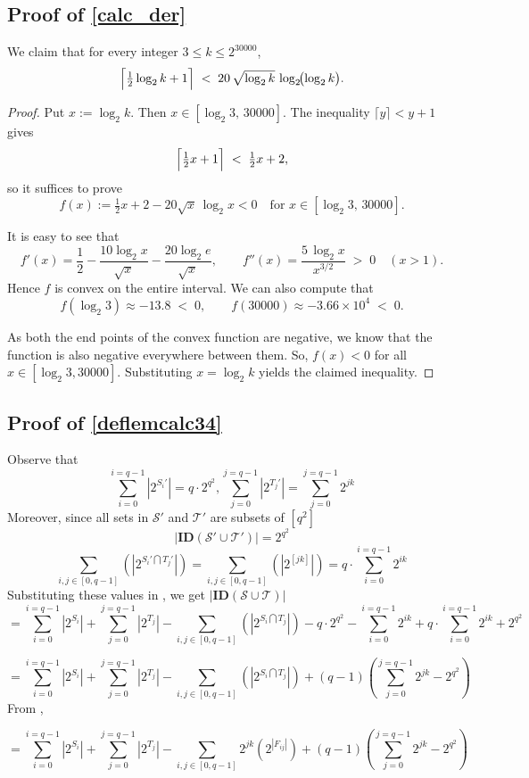 \documentclass[11pt,a4paper]{article}
\theoremstyle{definition}
\begin{document}
\subsection{Proof of \texorpdfstring{\cref{calc_der}}{Observation 24}}\label{proof_of_calc_der}

We claim that for every integer $3 \le k \le 2^{30000}$,
\[
\Bigl\lceil \tfrac12\log_2 k + 1 \Bigr\rceil
\;<\;
20\,\sqrt{\log_2 k}\,
      \log_2\!\bigl(\log_2 k\bigr).
\]


\begin{proof}
Put $x:=\log_2 k$.  Then $x\in[\log_2 3,\,30000]$.  The inequality
\(\lceil y\rceil<y+1\) gives
\[
\Bigl\lceil \tfrac12 x + 1 \Bigr\rceil
\;<\;
\tfrac12 x + 2,
\]
so it suffices to prove
\[
f(x):=\tfrac12 x + 2 - 20\sqrt{x}\,\log_2 x<0
\quad\text{for }x\in[\log_2 3,\,30000].
\]

\medskip
It is easy to see that
\[
f'(x)=\frac12-\frac{10\log_2 x}{\sqrt{x}}
      -\frac{20\log_2 e}{\sqrt{x}}, 
\qquad
f''(x)
      =\frac{5\,\log_2 x}{x^{3/2}}
      \;>\;0
      \quad(x>1).
\]
Hence \(f\) is convex on the entire interval. We can also compute that
\[
f(\log_2 3)\approx -13.8\;<\;0,
\qquad
f(30000)\approx -3.66\times 10^{4}\;<\;0.
\]


As both the end points of the convex function are negative, we know that the function is also negative everywhere between them. So, \(f(x)<0\) for all
\(x\in[\log_2 3,30000]\).
Substituting \(x=\log_2 k\) yields the claimed inequality.
\end{proof}

\subsection{Proof of \texorpdfstring{\cref{deflemcalc34}}{Lemma 34}}\label{obsalgman}
Observe that $$ \sum_{i=0}^{i=q-1} |2^{S_i'}| = q\cdot 2^{q^2}, \sum_{j=0}^{j=q-1} |2^{T_j'}| = \sum_{j=0}^{j=q-1} 2^{jk}$$
Moreover, since all sets in $\mathcal{S}'$ and $\mathcal{T}'$ are subsets of $[q^2]$
$$|\mathbf{ID}(\mathcal{S}'\cup \mathcal{T}')|=2^{q^2}$$
$$ \sum_{i,j \in [0,q-1]} (|2^{S_i'\bigcap T_j'}|) = \sum_{i,j \in [0,q-1]} (|2^{[jk]}|) =q\cdot \sum_{i=0}^{i=q-1} 2^{ik} $$
Substituting these values in , we get $|\mathbf{ID}(\mathcal{S}\cup \mathcal{T})|$
$$ = \sum_{i=0}^{i=q-1} |2^{S_i}| + \sum_{j=0}^{j=q-1} |2^{T_j}| - \sum_{i,j \in [0,q-1]} (|2^{S_i\bigcap T_j}|)
-q\cdot 2^{q^2} - \sum_{i=0}^{i=q-1} 2^{ik} + q\cdot \sum_{i=0}^{i=q-1} 2^{ik} + 2^{q^2}$$

$$ = \sum_{i=0}^{i=q-1} |2^{S_i}| + \sum_{j=0}^{j=q-1} |2^{T_j}| - \sum_{i,j \in [0,q-1]} (|2^{S_i\bigcap T_j}|) +(q-1)(\sum_{j=0}^{j=q-1} 2^{jk} - 2^{q^2})$$
From ,

$$ = \sum_{i=0}^{i=q-1} |2^{S_i}| + \sum_{j=0}^{j=q-1} |2^{T_j}| - \sum_{i,j \in [0,q-1]} 2^{jk}(2^{|F_{ij}|}) +(q-1)(\sum_{j=0}^{j=q-1} 2^{jk} - 2^{q^2})$$

%

%
\end{document}
